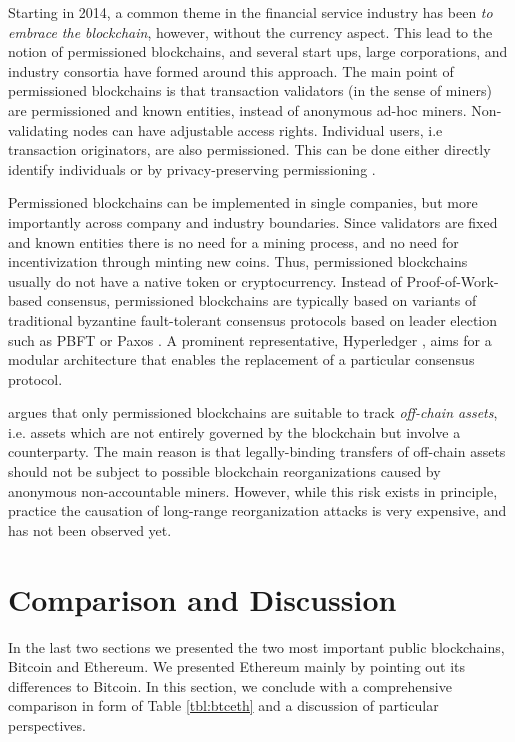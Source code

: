 Starting in 2014, a common theme in the financial service industry has been \emph{to embrace the blockchain}, however, without the currency aspect. This lead to the notion of permissioned blockchains, and several start ups, large corporations, and industry consortia have formed around this approach. The main point of permissioned blockchains is that transaction validators (in the sense of miners) are permissioned and known entities, instead of anonymous ad-hoc miners. Non-validating nodes can have adjustable access rights. Individual users, i.e transaction originators, are also permissioned. This can be done either directly identify individuals or by privacy-preserving permissioning \parencite{hardjono2016chain,Hardjono:2016:CCC:2899007.2899012}.

Permissioned blockchains can be implemented in single companies, but more importantly across company and industry boundaries. Since validators are fixed and known entities there is no need for a mining process, and no need for incentivization through minting new coins. Thus, permissioned blockchains usually do not have a native token or cryptocurrency. Instead of Proof-of-Work-based consensus, permissioned blockchains are typically based on variants of traditional byzantine fault-tolerant consensus protocols based on leader election such as PBFT \parencite{castro1999practical} or Paxos \parencite{lamport2001paxos}. A prominent representative, Hyperledger \parencite{cachin2016architecture}, aims for a modular architecture that enables the replacement of a particular consensus protocol.

\cite{swanson2015consensus} argues that only permissioned blockchains are suitable to track \emph{off-chain assets}, i.e. assets which are not entirely governed by the blockchain but involve a counterparty. The main reason is that legally-binding transfers of off-chain assets should not be subject to possible blockchain reorganizations caused by anonymous non-accountable miners. However, while this risk exists in principle, practice the causation of long-range reorganization attacks is very expensive, and has not been observed yet.


\section{Comparison and Discussion}

In the last two sections we presented the two most important public blockchains, Bitcoin and Ethereum. We presented Ethereum mainly by pointing out its differences to Bitcoin. In this section, we conclude with a comprehensive comparison in form of  Table \ref{tbl:btceth} and a discussion of particular perspectives.

